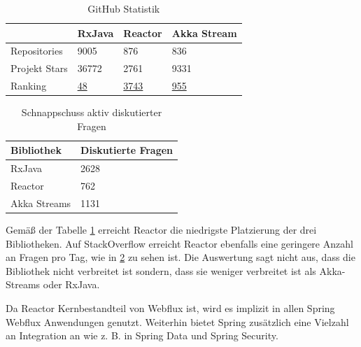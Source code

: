 \subsubsection{\criteriaVerbreitung}
\begin{table}[H]
\caption{GitHub Statistik}
\centering
\begin{tabular}{l|l|l|l|}
\cline{2-4}
              & \cellcolor[HTML]{00A99D}RxJava & \cellcolor[HTML]{00A99D}Reactor & \cellcolor[HTML]{00A99D}Akka Stream \\ \hline
\multicolumn{1}{|l|}{\cellcolor[HTML]{00A99D}Repositories}  & 9005                          & 876                             & 836                                \\ \hline
\multicolumn{1}{|l|}{\cellcolor[HTML]{00A99D}Projekt Stars} & 36772                         & 2761                            & 9331                               \\ \hline
\multicolumn{1}{|l|}{\cellcolor[HTML]{00A99D}Ranking}		  & \href{https://gitstar-ranking.com/ReactiveX/RxJava}{48}							   & \href{https://gitstar-ranking.com/reactor/reactor}{3743}							 & \href{https://gitstar-ranking.com/akka/akka}{955}								   \\ \hline
\end{tabular}
\label{github:statistic:reactor}
\end{table}

\begin{table}[H]
\centering
\caption{Schnappschuss aktiv diskutierter Fragen}
\begin{tabular}{|l|l|}
\hline
\rowcolor[HTML]{00A99D} 
Bibliothek   & Diskutierte Fragen \\ \hline
RxJava       & 2628   \\ \hline
Reactor     & 762    \\ \hline
Akka Streams & 1131   \\ \hline
\end{tabular}
\label{stackoverflow_snapshot:reactor}
\end{table}

Gemäß der Tabelle \ref{github:statistic:reactor} erreicht Reactor die niedrigste Platzierung der drei Bibliotheken. Auf StackOverflow erreicht Reactor ebenfalls eine geringere Anzahl an Fragen pro Tag, wie in \ref{stackoverflow_snapshot:reactor} zu sehen ist. Die Auswertung sagt nicht aus, dass die Bibliothek nicht verbreitet ist sondern, dass sie weniger verbreitet ist als Akka-Streams oder RxJava.

Da Reactor Kernbestandteil von Webflux ist, wird es implizit in allen Spring Webflux Anwendungen genutzt. Weiterhin bietet Spring zusätzlich eine Vielzahl an Integration an wie z. B. in Spring Data und Spring Security.


